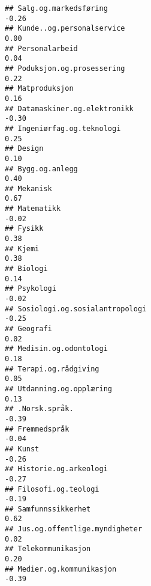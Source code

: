 \documentclass[
]{article}
\begin{document}
\begin{verbatim}
## Salg.og.markedsføring                                                            -0.26
## Kunde..og.personalservice                                                         0.00
## Personalarbeid                                                                    0.04
## Poduksjon.og.prosessering                                                         0.22
## Matproduksjon                                                                     0.16
## Datamaskiner.og.elektronikk                                                      -0.30
## Ingeniørfag.og.teknologi                                                          0.25
## Design                                                                            0.10
## Bygg.og.anlegg                                                                    0.40
## Mekanisk                                                                          0.67
## Matematikk                                                                       -0.02
## Fysikk                                                                            0.38
## Kjemi                                                                             0.38
## Biologi                                                                           0.14
## Psykologi                                                                        -0.02
## Sosiologi.og.sosialantropologi                                                   -0.25
## Geografi                                                                          0.02
## Medisin.og.odontologi                                                             0.18
## Terapi.og.rådgiving                                                               0.05
## Utdanning.og.opplæring                                                            0.13
## .Norsk.språk.                                                                    -0.39
## Fremmedspråk                                                                     -0.04
## Kunst                                                                            -0.26
## Historie.og.arkeologi                                                            -0.27
## Filosofi.og.teologi                                                              -0.19
## Samfunnssikkerhet                                                                 0.62
## Jus.og.offentlige.myndigheter                                                     0.02
## Telekommunikasjon                                                                 0.20
## Medier.og.kommunikasjon                                                          -0.39

\end{verbatim}
\end{document}
